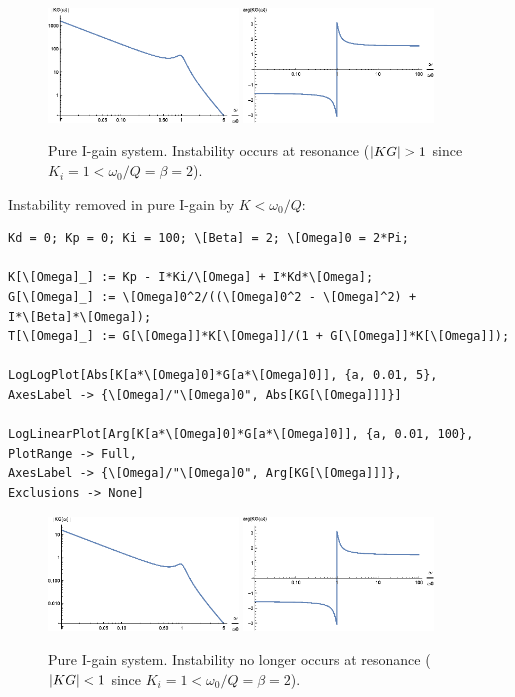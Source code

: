 \documentclass{article}
\theoremstyle{definition}
\begin{document}
\begin{figure}[!htb]
	\centering
	\includegraphics[width=0.45\textwidth]{bode_7}
	\quad
	\includegraphics[width=0.45\textwidth]{bode_8}
	\caption{Pure I-gain system. Instability occurs at resonance ($\abs{KG}> 1$ since $K_i = 1 < \omega_0/Q = \beta = 2$).} %
	\label{fig:bode_4}
\end{figure}


\noindent Instability removed in pure I-gain by $K < \omega_0/Q$:
\begin{lstlisting}
Kd = 0; Kp = 0; Ki = 100; \[Beta] = 2; \[Omega]0 = 2*Pi;

K[\[Omega]_] := Kp - I*Ki/\[Omega] + I*Kd*\[Omega]; 
G[\[Omega]_] := \[Omega]0^2/((\[Omega]0^2 - \[Omega]^2) + 
I*\[Beta]*\[Omega]); 
T[\[Omega]_] := G[\[Omega]]*K[\[Omega]]/(1 + G[\[Omega]]*K[\[Omega]]);

LogLogPlot[Abs[K[a*\[Omega]0]*G[a*\[Omega]0]], {a, 0.01, 5}, 
AxesLabel -> {\[Omega]/"\[Omega]0", Abs[KG[\[Omega]]]}]

LogLinearPlot[Arg[K[a*\[Omega]0]*G[a*\[Omega]0]], {a, 0.01, 100}, 
PlotRange -> Full, 
AxesLabel -> {\[Omega]/"\[Omega]0", Arg[KG[\[Omega]]]}, 
Exclusions -> None]
\end{lstlisting}


\begin{figure}[!htb]
	\centering
	\includegraphics[width=0.45\textwidth]{bode_9}
	\quad
	\includegraphics[width=0.45\textwidth]{bode_10}
	\caption{Pure I-gain system. Instability no longer occurs at resonance ($\abs{KG}< 1$ since $K_i = 1 < \omega_0/Q = \beta = 2$).} %
	\label{fig:bode_5}
\end{figure}
\end{document}
